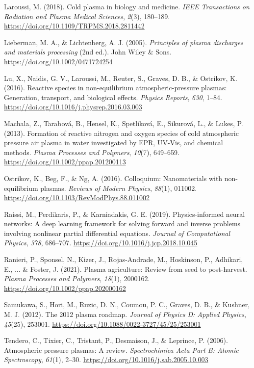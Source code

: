 Laroussi, M. (2018). Cold plasma in biology and medicine. \textit{IEEE Transactions on Radiation and Plasma Medical Sciences}, \textit{2}(3), 180--189. \url{https://doi.org/10.1109/TRPMS.2018.2811442}

Lieberman, M. A., \& Lichtenberg, A. J. (2005). \textit{Principles of plasma discharges and materials processing} (2nd ed.). John Wiley \& Sons. \url{https://doi.org/10.1002/0471724254}

Lu, X., Naidis, G. V., Laroussi, M., Reuter, S., Graves, D. B., \& Ostrikov, K. (2016). Reactive species in non-equilibrium atmospheric-pressure plasmas: Generation, transport, and biological effects. \textit{Physics Reports}, \textit{630}, 1--84. \url{https://doi.org/10.1016/j.physrep.2016.03.003}

Machala, Z., Tarabov\'{a}, B., Hensel, K., Spetlikov\'{a}, E., Sikurov\'{a}, L., \& Lukes, P. (2013). Formation of reactive nitrogen and oxygen species of cold atmospheric pressure air plasma in water investigated by EPR, UV-Vis, and chemical methods. \textit{Plasma Processes and Polymers}, \textit{10}(7), 649--659. \url{https://doi.org/10.1002/ppap.201200113}

Ostrikov, K., Beg, F., \& Ng, A. (2016). Colloquium: Nanomaterials with non-equilibrium plasmas. \textit{Reviews of Modern Physics}, \textit{88}(1), 011002. \url{https://doi.org/10.1103/RevModPhys.88.011002}

Raissi, M., Perdikaris, P., \& Karniadakis, G. E. (2019). Physics-informed neural networks: A deep learning framework for solving forward and inverse problems involving nonlinear partial differential equations. \textit{Journal of Computational Physics}, \textit{378}, 686--707. \url{https://doi.org/10.1016/j.jcp.2018.10.045}

Ranieri, P., Sponsel, N., Kizer, J., Rojas-Andrade, M., Hoskinson, P., Adhikari, E., ... \& Foster, J. (2021). Plasma agriculture: Review from seed to post-harvest. \textit{Plasma Processes and Polymers}, \textit{18}(1), 2000162. \url{https://doi.org/10.1002/ppap.202000162}

Samukawa, S., Hori, M., Ruzic, D. N., Coumou, P. C., Graves, D. B., \& Kushner, M. J. (2012). The 2012 plasma roadmap. \textit{Journal of Physics D: Applied Physics}, \textit{45}(25), 253001. \url{https://doi.org/10.1088/0022-3727/45/25/253001}

Tendero, C., Tixier, C., Tristant, P., Desmaison, J., \& Leprince, P. (2006). Atmospheric pressure plasmas: A review. \textit{Spectrochimica Acta Part B: Atomic Spectroscopy}, \textit{61}(1), 2--30. \url{https://doi.org/10.1016/j.sab.2005.10.003}

